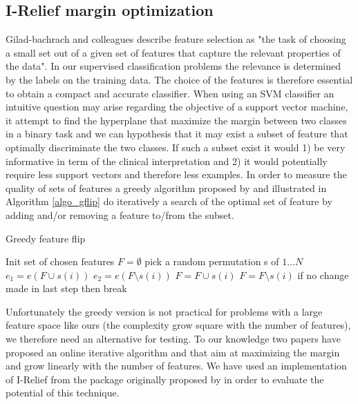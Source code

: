 \documentclass[12pt,journal,compsoc]{IEEEtran}
\begin{document}
\subsection{I-Relief margin optimization}
Gilad-bachrach and colleagues \cite{Gilad-bachrach2004} describe feature selection as "the task of choosing a small set out of a given set of features that capture the relevant properties of the data". In our supervised classification problems the relevance is determined by the labels on the training data. The choice of the features is therefore essential to obtain a compact and accurate classifier. When using an SVM classifier an intuitive question may arise regarding the objective of a support vector machine,  it attempt to find the hyperplane that maximize the margin between two classes in a binary task and we can hypothesis that it may exist a subset of feature that optimally discriminate the two classes. If such a subset exist it would 1) be very informative in term of the clinical interpretation and 2) it would potentially require less support vectors and therefore less examples. In order to measure the quality of sets of features a greedy algorithm proposed by \cite{Gilad-bachrach2004} and illustrated in Algorithm \ref{algo_gflip} do iteratively a search of the optimal set of feature by adding and/or removing a feature to/from the subset.

\begin{algorithm}
\caption{Greedy feature flip}
\begin{algorithmic} 
\STATE Init set of chosen features $F = \emptyset$
\STATE pick a random permutation s of ${1...N}$
\STATE $e_{1}=e(F\cup{s(i)})$
\STATE $e_{2}=e(F\setminus{s(i)})$
\STATE $F=F\cup{s(i)}$
\ELSE
\STATE $F=F\setminus{s(i)}$
\ENDIF
\ENDFOR
\STATE if no change made in last step then break
\ENDFOR
\end{algorithmic}
\label{algo_gflip}
\end{algorithm}

Unfortunately the greedy version is not practical for problems with a large feature space like ours (the complexity grow square with the number of features), we therefore need an alternative for testing. To our knowledge two papers have proposed an online iterative algorithm \cite{Gilad-bachrach2004} and \cite{Sun2007} that aim at maximizing the margin and grow linearly with the number of features. We have used an implementation of I-Relief from the package \cite{Hanke2009} originally proposed by \cite{Sun2007} in order to evaluate the potential of this technique.
\end{document}
